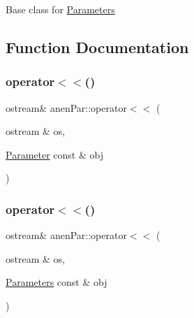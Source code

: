 Base class for \mbox{\hyperlink{classanen_par_1_1_parameters}{Parameters}} 

\subsection{Function Documentation}
\mbox{\label{namespaceanen_par_a52a5a22e980d0d41a493b6cb3f5b0bb4}} 
\subsubsection{\texorpdfstring{operator$<$$<$()}{operator<<()}\hspace{0.1cm}{\footnotesize\ttfamily [1/2]}}
{\footnotesize\ttfamily ostream\& anen\+Par\+::operator$<$$<$ (\begin{DoxyParamCaption}\item[{ostream \&}]{os,  }\item[{\mbox{\hyperlink{classanen_par_1_1_parameter}{Parameter}} const \&}]{obj }\end{DoxyParamCaption})}

\mbox{\label{namespaceanen_par_a670cbfb557a503e08dd170516c81b075}} 
\subsubsection{\texorpdfstring{operator$<$$<$()}{operator<<()}\hspace{0.1cm}{\footnotesize\ttfamily [2/2]}}
{\footnotesize\ttfamily ostream\& anen\+Par\+::operator$<$$<$ (\begin{DoxyParamCaption}\item[{ostream \&}]{os,  }\item[{\mbox{\hyperlink{classanen_par_1_1_parameters}{Parameters}} const \&}]{obj }\end{DoxyParamCaption})}

